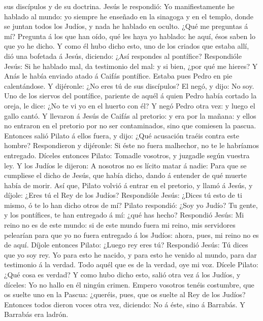 sus discípulos y de su doctrina.  Jesús le respondió: Yo
manifiestamente he hablado al mundo: yo siempre he enseñado en la
sinagoga y en el templo, donde se juntan todos los Judíos, y nada he
hablado en oculto.  ¿Qué me preguntas á mí? Pregunta á
los que han oído, qué les haya yo hablado: he aquí, ésos saben lo que yo
he dicho.  Y como él hubo dicho esto, uno de los criados
que estaba allí, dió una bofetada á Jesús, diciendo: ¿Así respondes al
pontífice?  Respondióle Jesús: Si he hablado mal, da
testimonio del mal: y si bien, ¿por qué me hieres?  Y
Anás le había enviado atado á Caifás pontífice.  Estaba
pues Pedro en pie calentándose. Y dijéronle: ¿No eres tú de sus
discípulos? El negó, y dijo: No soy.  Uno de los siervos
del pontífice, pariente de aquél á quien Pedro había cortado la oreja,
le dice: ¿No te vi yo en el huerto con él?  Y negó Pedro
otra vez: y luego el gallo cantó.  Y llevaron á Jesús de
Caifás al pretorio: y era por la mañana: y ellos no entraron en el
pretorio por no ser contaminados, sino que comiesen la pascua.
 Entonces salió Pilato á ellos fuera, y dijo: ¿Qué
acusación traéis contra este hombre?  Respondieron y
dijéronle: Si éste no fuera malhechor, no te le habríamos entregado.
 Díceles entonces Pilato: Tomadle vosotros, y juzgadle
según vuestra ley. Y los Judíos le dijeron: A nosotros no es lícito
matar á nadie:  Para que se cumpliese el dicho de Jesús,
que había dicho, dando á entender de qué muerte había de morir.
 Así que, Pilato volvió á entrar en el pretorio, y llamó
á Jesús, y díjole: ¿Eres tú el Rey de los Judíos? 
Respondióle Jesús: ¿Dices tú esto de ti mismo, ó te lo han dicho otros
de mí?  Pilato respondió: ¿Soy yo Judío? Tu gente, y los
pontífices, te han entregado á mí: ¿qué has hecho? 
Respondió Jesús: Mi reino no es de este mundo: si de este mundo fuera mi
reino, mis servidores pelearían para que yo no fuera entregado á los
Judíos: ahora, pues, mi reino no es de aquí.  Díjole
entonces Pilato: ¿Luego rey eres tú? Respondió Jesús: Tú dices que yo
soy rey. Yo para esto he nacido, y para esto he venido al mundo, para
dar testimonio á la verdad. Todo aquél que es de la verdad, oye mi voz.
 Dícele Pilato: ¿Qué cosa es verdad? Y como hubo dicho
esto, salió otra vez á los Judíos, y díceles: Yo no hallo en él ningún
crimen.  Empero vosotros tenéis costumbre, que os suelte
uno en la Pascua: ¿queréis, pues, que os suelte al Rey de los Judíos?
 Entonces todos dieron voces otra vez, diciendo: No á
éste, sino á Barrabás. Y Barrabás era ladrón.

